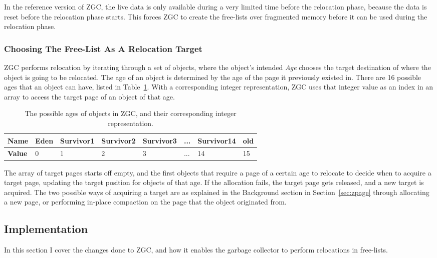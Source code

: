 In the reference version of ZGC, the live data is only available during a very limited time before the relocation phase, because the data is reset before the relocation phase starts. This forces ZGC to create the free-lists over fragmented memory before it can be used during the relocation phase.

\subsubsection{Choosing The Free-List As A Relocation Target}
\label{sec:analyse-use}

ZGC performs relocation by iterating through a set of objects, where the object's intended \textit{Age} chooses the target destination of where the object is going to be relocated. The age of an object is determined by the age of the page it previously existed in. There are 16 possible ages that an object can have, listed in Table~\ref{table:zpage_ages}. With a corresponding integer representation, ZGC uses that integer value as an index in an array to access the target page of an object of that age. 

\begin{table}[H]
      \centering
      \begin{tabular}{|l|l|l|l|l|l|l|l|}
                \hline
                \textbf{Name} & Eden & Survivor1 & Survivor2 & Survivor3 & ... & Survivor14 & old \\ \hline
                \textbf{Value} & 0 & 1 & 2 & 3 & ... & 14 & 15 \\ \hline
      \end{tabular}
      \caption{The possible ages of objects in ZGC, and their corresponding integer representation.}
      \label{table:zpage_ages}
\end{table}

The array of target pages starts off empty, and the first objects that require a page of a certain age to relocate to decide when to acquire a target page, updating the target position for objects of that age. If the allocation fails, the target page gets released, and a new target is acquired. The two possible ways of acquiring a target are as explained in the Background section in Section~\ref*{sec:zpage} through allocating a new page, or performing in-place compaction on the page that the object originated from.

\subsection{Implementation}
In this section I cover the changes done to ZGC, and how it enables the garbage collector to perform relocations in free-lists.

